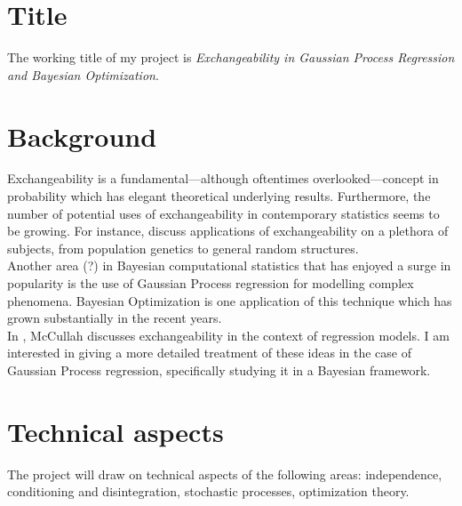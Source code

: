 \documentclass[]{STAT_547C}
\begin{document}
\vspace{-2cm}


\section{Title}

The working title of my project is \emph{Exchangeability in Gaussian Process Regression and Bayesian Optimization}.  

\section{Background}


Exchangeability is a fundamental---although oftentimes overlooked---concept in probability which has elegant theoretical underlying results. Furthermore, the number of potential uses of exchangeability in contemporary statistics seems to be growing. For instance, \cite{Kingman:1978, Aldous:2010, Orbanz:Roy:2015} discuss applications of exchangeability on a plethora of subjects, from population genetics to general random structures. \\

Another area (?) in Bayesian computational statistics that has enjoyed a surge in popularity is the use of Gaussian Process regression for modelling complex phenomena. Bayesian Optimization is one application of this technique which has grown substantially in the recent years. \\

In \cite{McCullagh:2005:ExchAndReg}, McCullah discusses exchangeability in the context of regression models. I am interested in giving a more detailed treatment of these ideas in the case of Gaussian Process regression, specifically studying it in a Bayesian framework.



\section{Technical aspects}

The project will draw on technical aspects of the following areas: independence, conditioning and disintegration, stochastic processes, optimization theory.
\end{document}
